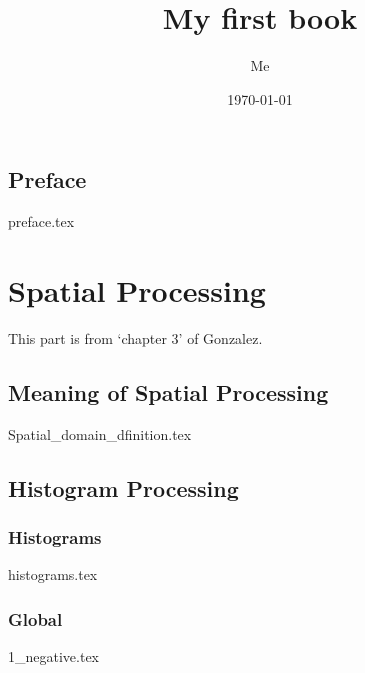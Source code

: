 \documentclass{book}
\title{My first book}
\author{Me}
\date{\today}
\begin{document}
\maketitle

\frontmatter

\tableofcontents

\listoffigures

\chapter{Preface}
{preface.tex}

\mainmatter
\part{Spatial Processing}
This part is from `chapter 3' of Gonzalez.

\chapter{Meaning of Spatial Processing}

{Spatial_domain_dfinition.tex}


\chapter{Histogram Processing}

\section{Histograms}
{histograms.tex}

\section{Global}

{1_negative.tex}
\end{document}
